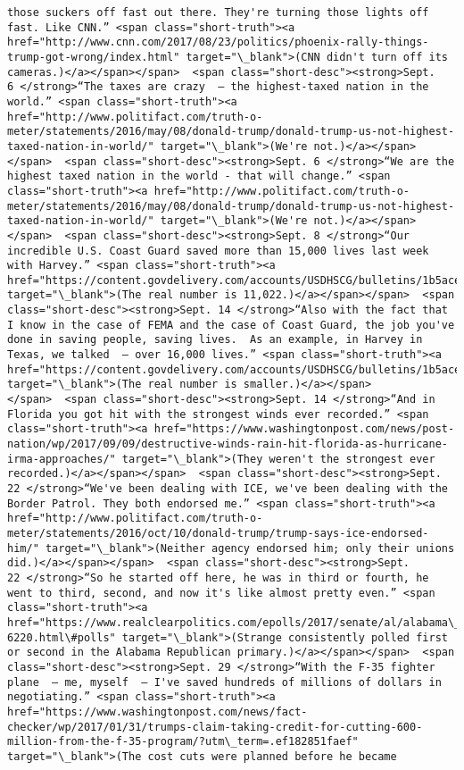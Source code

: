 \documentclass[11pt]{article}
\begin{document}
\begin{Verbatim}[commandchars=\\\{\}]
those suckers off fast out there. They're turning those lights off fast. Like CNN.” <span class="short-truth"><a href="http://www.cnn.com/2017/08/23/politics/phoenix-rally-things-trump-got-wrong/index.html" target="\_blank">(CNN didn't turn off its cameras.)</a></span></span>  <span class="short-desc"><strong>Sept. 6 </strong>“The taxes are crazy  – the highest-taxed nation in the world.” <span class="short-truth"><a href="http://www.politifact.com/truth-o-meter/statements/2016/may/08/donald-trump/donald-trump-us-not-highest-taxed-nation-in-world/" target="\_blank">(We're not.)</a></span></span>  <span class="short-desc"><strong>Sept. 6 </strong>“We are the highest taxed nation in the world - that will change.” <span class="short-truth"><a href="http://www.politifact.com/truth-o-meter/statements/2016/may/08/donald-trump/donald-trump-us-not-highest-taxed-nation-in-world/" target="\_blank">(We're not.)</a></span></span>  <span class="short-desc"><strong>Sept. 8 </strong>“Our incredible U.S. Coast Guard saved more than 15,000 lives last week with Harvey.” <span class="short-truth"><a href="https://content.govdelivery.com/accounts/USDHSCG/bulletins/1b5ace3" target="\_blank">(The real number is 11,022.)</a></span></span>  <span class="short-desc"><strong>Sept. 14 </strong>“Also with the fact that I know in the case of FEMA and the case of Coast Guard, the job you've done in saving people, saving lives.  As an example, in Harvey in Texas, we talked  – over 16,000 lives.” <span class="short-truth"><a href="https://content.govdelivery.com/accounts/USDHSCG/bulletins/1b5ace3" target="\_blank">(The real number is smaller.)</a></span></span>  <span class="short-desc"><strong>Sept. 14 </strong>“And in Florida you got hit with the strongest winds ever recorded.” <span class="short-truth"><a href="https://www.washingtonpost.com/news/post-nation/wp/2017/09/09/destructive-winds-rain-hit-florida-as-hurricane-irma-approaches/" target="\_blank">(They weren't the strongest ever recorded.)</a></span></span>  <span class="short-desc"><strong>Sept. 22 </strong>“We've been dealing with ICE, we've been dealing with the Border Patrol. They both endorsed me.” <span class="short-truth"><a href="http://www.politifact.com/truth-o-meter/statements/2016/oct/10/donald-trump/trump-says-ice-endorsed-him/" target="\_blank">(Neither agency endorsed him; only their unions did.)</a></span></span>  <span class="short-desc"><strong>Sept. 22 </strong>“So he started off here, he was in third or fourth, he went to third, second, and now it's like almost pretty even.” <span class="short-truth"><a href="https://www.realclearpolitics.com/epolls/2017/senate/al/alabama\_senate\_special\_election\_republican\_primary-6220.html\#polls" target="\_blank">(Strange consistently polled first or second in the Alabama Republican primary.)</a></span></span>  <span class="short-desc"><strong>Sept. 29 </strong>“With the F-35 fighter plane  – me, myself  – I've saved hundreds of millions of dollars in negotiating.” <span class="short-truth"><a href="https://www.washingtonpost.com/news/fact-checker/wp/2017/01/31/trumps-claim-taking-credit-for-cutting-600-million-from-the-f-35-program/?utm\_term=.ef182851faef" target="\_blank">(The cost cuts were planned before he became 
\end{Verbatim}
\end{document}
